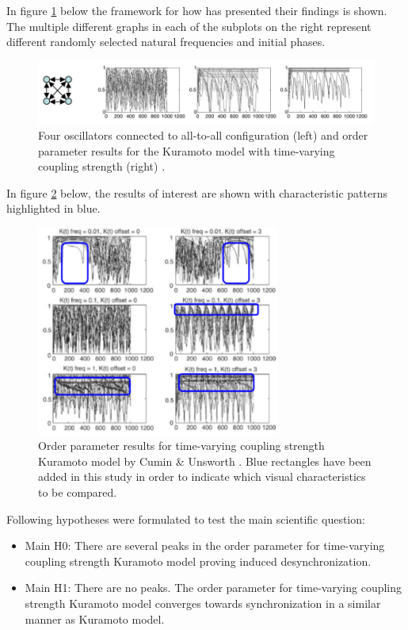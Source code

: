 \documentclass{article}
\begin{document}
In figure \ref{fig:1} below the framework for how \cite{Cumin} has presented their findings is shown. The multiple different graphs in each of the subplots on the right represent different randomly selected natural frequencies and initial phases.

\begin{figure}[H]
    \centering
    \includegraphics[width=14cm]{Cumin_fig1.png}
    \caption{Four oscillators connected to all-to-all configuration (left) and order parameter results for the Kuramoto model with time-varying coupling strength (right) \cite{Cumin}.}
    \label{fig:1}
\end{figure}

In figure \ref{fig:2} below, the results of interest are shown with characteristic patterns highlighted in blue.

\begin{figure}[H]
    \centering
    \includegraphics[width=8cm]{Cumin_fig2.png}
    \caption{Order parameter results for time-varying coupling strength Kuramoto model by Cumin \& Unsworth \cite{Cumin}. Blue rectangles have been added in this study in order to indicate which visual characteristics to be compared.}
    \label{fig:2}
\end{figure}

Following hypotheses were formulated to test the main scientific question:
\begin{itemize}
    \item Main H0: There are several peaks in the order parameter for time-varying coupling strength Kuramoto model proving induced desynchronization.
    \item Main H1: There are no peaks. The order parameter for time-varying coupling strength Kuramoto model converges towards synchronization in a similar manner as Kuramoto model.
\end{itemize}
\end{document}
